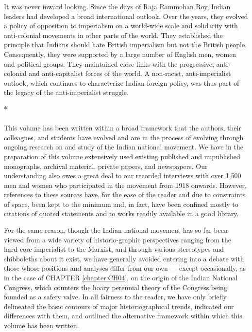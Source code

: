 \begin{multicols}{2}
It was never inward looking. Since the days of Raja Rammohan Roy, Indian leaders had developed a broad international outlook. Over the years, they evolved a policy of opposition to imperialism on a world-wide scale and solidarity with anti-colonial movements in other parts of the world. They established the principle that Indians should hate British imperialism but not the British people. Consequently, they were supported by a large number of English men, women and political groups. They maintained close links with the progressive, anti-colonial and anti-capitalist forces of the world. A non-racist, anti-imperialist outlook, which continues to characterize Indian foreign policy, was thus part of the legacy of the anti-imperialist struggle.

\begin{center}*\end{center}

\paragraph*{}
This volume has been written within a broad framework that the authors, their colleagues, and students have evolved and are in the process of evolving through ongoing research on and study of the Indian national movement. We have in the preparation of this volume extensively used existing published and unpublished monographs, archival material, private papers, and newspapers. Our understanding also owes a great deal to our recorded interviews with over 1,500 men and women who participated in the movement from 1918 onwards. However, references to these sources have, for the ease of the reader and due to constraints of space, been kept to the minimum and, in fact, have been confined mostly to citations of quoted statements and to works readily available in a good library.

For the same reason, though the Indian national movement has so far been viewed from a wide variety of historio-graphic perspectives ranging from the hard-core imperialist to the Marxist, and through various stereotypes and shibboleths about it exist, we have generally avoided entering into a debate with those whose positions and analyses differ from our own --- except occasionally, as in the case of CHAPTER \ref{chapter:CH04}, on the origin of the Indian National Congress, which counters the hoary perennial theory of the Congress being founded as a safety valve. In all fairness to the reader, we have only briefly delineated the basic contours of major historiographical trends, indicated our differences with them, and outlined the alternative framework within which this volume has been written.


\end{multicols}
